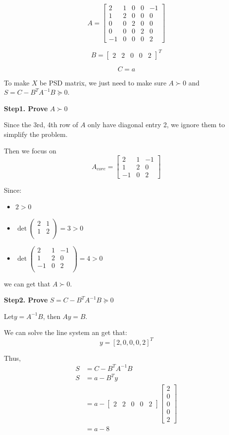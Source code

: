 \documentclass{article}
\newcommand{\0}{{\mathbf{0}}} %
\begin{document}
$$A =
\begin{bmatrix}
2 & 1 & 0 & 0 & -1 \\
1 & 2 & 0 & 0 & 0 \\
0 & 0 & 2 & 0 & 0 \\
0 & 0 & 0 & 2 & 0 \\
-1 & 0 & 0 & 0 & 2
\end{bmatrix}$$

$$B =
\begin{bmatrix} 2 & 2 & 0 & 0 & 2
\end{bmatrix}^T$$

$$C = a$$

To make $X$ be PSD matrix, we just need to make sure $ A \succ 0 $ and $S = C - B^T A^{-1} B \succeq 0$.

\textbf{Step1. Prove} $ A \succ 0 $

Since the 3rd, 4th row of $A$ only have diagonal entry 2, we ignore them to simplify the problem.

Then we focus on
$$A_{core} =
\begin{bmatrix} 2 & 1 & -1 \\ 1 & 2 & 0 \\ -1 & 0 & 2
\end{bmatrix}$$

Since:
\begin{itemize}
\item $2>0$
\item $\det{\left(
\begin{matrix}
2 & 1   \\
1 & 2   \\
\end{matrix}\right)} = 3 > 0
$
\item $\det{\left(
\begin{matrix}
2 & 1 & -1   \\
1 & 2 & 0  \\
-1 & 0 & 2  \\
\end{matrix}\right)} = 4 > 0
$
\end{itemize}
we can get that $ A \succ 0 $.

\textbf{Step2. Prove} $S = C - B^T A^{-1} B \succeq 0$

Let$y = A^{-1} B$, then $Ay = B$.

We can solve the line system an get that:
$$
y = [2, 0, 0, 0, 2]^T
$$

Thus,
\begin{align*}
S &= C - B^T A^{-1} B  \\
S &= a - B^T y  \\
&= a -
\begin{bmatrix} 2 & 2 & 0 & 0 & 2
\end{bmatrix}
\begin{bmatrix} 2 \\ 0 \\ 0 \\ 0 \\ 2
\end{bmatrix}  \\
&= a - 8
\end{align*}
\end{document}
